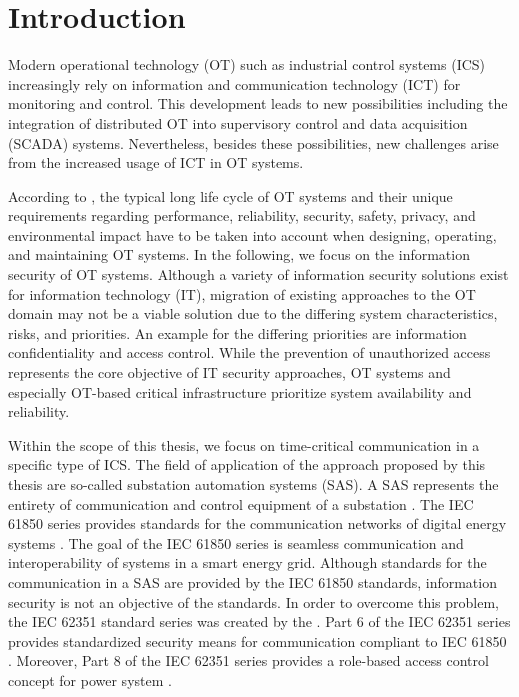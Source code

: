 \chapter{Introduction}
\label{ch:introduction}
Modern operational technology (OT) such as industrial control systems (ICS) increasingly rely on information and communication technology (ICT) for monitoring and control.
This development leads to new possibilities including the integration of distributed OT into supervisory control and data acquisition (SCADA) systems.
Nevertheless, besides these possibilities, new challenges arise from the increased usage of ICT in OT systems.

According to \citeauthor{Stouffer2023} \cite{Stouffer2023}, the typical long life cycle of OT systems and their unique requirements regarding performance, reliability, security, safety, privacy, and environmental impact have to be taken into account when designing, operating, and maintaining OT systems.
In the following, we focus on the information security of OT systems.
Although a variety of information security solutions exist for information technology (IT), migration of existing approaches to the OT domain may not be a viable solution due to the differing system characteristics, risks, and priorities.
An example for the differing priorities are information confidentiality and access control.
While the prevention of unauthorized access represents the core objective of IT security approaches, OT systems and especially OT-based critical infrastructure prioritize system availability and reliability.

Within the scope of this thesis, we focus on time-critical communication in a specific type of ICS.
The field of application of the approach proposed by this thesis are so-called substation automation systems (SAS).
A SAS represents the entirety of communication and control equipment of a substation \cite{Padilla2015}.
The IEC 61850 series provides standards for the communication networks of digital energy systems \cite{IEC61850P5}.
The goal of the IEC 61850 series is seamless communication and interoperability of systems in a smart energy grid.
Although standards for the communication in a SAS are provided by the IEC 61850 standards, information security is not an objective of the standards.
In order to overcome this problem, the IEC 62351 standard series was created by the \citeauthor{IEC62351P6}.
Part 6 of the IEC 62351 series provides standardized security means for communication compliant to IEC 61850 \cite{IEC62351P6}.
Moreover, Part 8 of the IEC 62351 series provides a role-based access control concept for power system \cite{IEC62351P8}.

